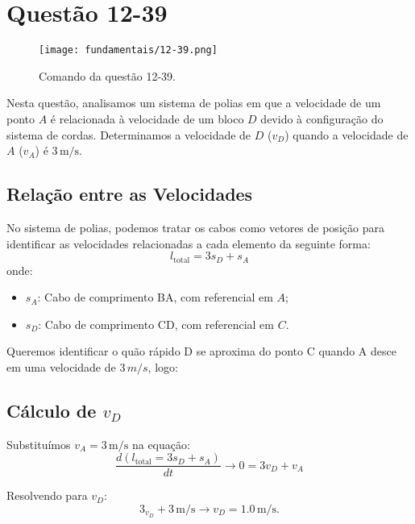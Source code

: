 \newpage
\section{Questão 12-39}

\begin{figure}[H]
	\centering
	\texttt{[image: fundamentais/12-39.png]}
	\caption{Comando da questão 12-39.}\label{fig:12-39}
\end{figure}

Nesta questão, analisamos um sistema de polias em que a velocidade de um ponto \(A\) é relacionada à velocidade de um bloco \(D\) devido à configuração do sistema de cordas. Determinamos a velocidade de \(D\) (\(v_D\)) quando a velocidade de \(A\) (\(v_A\)) é \(3 \, \text{m/s}\).

\subsection*{Relação entre as Velocidades}
No sistema de polias, podemos tratar os cabos como vetores de posição para identificar as velocidades relacionadas a cada elemento da seguinte forma:
\[
l_{\text{total}} = 3s_D + s_A
\]
onde:
\begin{itemize}
    \item \(s_A\): Cabo de comprimento BA, com referencial em \(A\);
    \item \(s_D\): Cabo de comprimento CD, com referencial em  \(C\).
\end{itemize}

Queremos identificar o quão rápido D se aproxima do ponto C quando A desce em uma velocidade de \(3\, m/s\), logo:
\subsection*{Cálculo de \(v_D\)}
Substituímos \(v_A = 3 \, \text{m/s}\) na equação:
\[
\frac{d \left(l_{\text{total}} = 3s_D + s_A\right)}{dt} \rightarrow 0 = 3v_D + v_A
\]

Resolvendo para \(v_D\):
\[
3_v_D + 3 \, \text{m/s} \rightarrow v_D = 1.0 \, \text{m/s}.
\]

